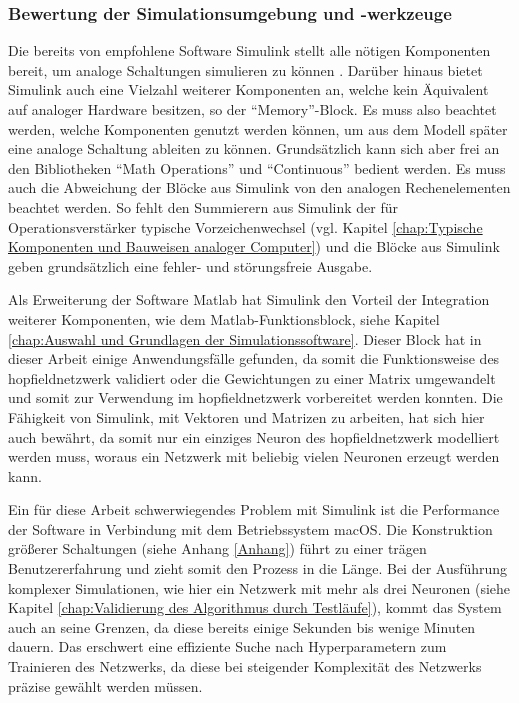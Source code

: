 \subsubsection{Bewertung der Simulationsumgebung und -werkzeuge}
\label{chap:Bewertung der Simulationsumgebung und -werkzeuge}

Die bereits von \citeauthor{Ulmann2022} empfohlene Software Simulink stellt alle nötigen Komponenten bereit, um analoge Schaltungen simulieren zu können \cite[vgl. S. 240]{Ulmann2022}. Darüber hinaus bietet Simulink auch eine Vielzahl weiterer Komponenten an, welche kein Äquivalent auf analoger Hardware besitzen, so \zb der "`Memory"'-Block. Es muss also beachtet werden, welche Komponenten genutzt werden können, um aus dem Modell später eine analoge Schaltung ableiten zu können. Grundsätzlich kann sich aber frei an den Bibliotheken "`Math Operations"' und "`Continuous"' bedient werden. Es muss auch die Abweichung der Blöcke aus Simulink von den analogen Rechenelementen beachtet werden. So fehlt \zb den Summierern aus Simulink der für Operationsverstärker typische Vorzeichenwechsel (vgl. Kapitel \ref{chap:Typische Komponenten und Bauweisen analoger Computer}) und die Blöcke aus Simulink geben grundsätzlich eine fehler- und störungsfreie Ausgabe.

Als Erweiterung der Software Matlab hat Simulink den Vorteil der Integration weiterer Komponenten, wie dem Matlab-Funktionsblock, siehe Kapitel \ref{chap:Auswahl und Grundlagen der Simulationssoftware}. Dieser Block hat in dieser Arbeit einige Anwendungsfälle gefunden, da somit \zb die Funktionsweise des \gls{hopfieldnetzwerk} validiert oder die Gewichtungen zu einer Matrix umgewandelt und somit zur Verwendung im \gls{hopfieldnetzwerk} vorbereitet werden konnten. Die Fähigkeit von Simulink, mit Vektoren und Matrizen zu arbeiten, hat sich hier auch bewährt, da somit nur ein einziges Neuron des \gls{hopfieldnetzwerk} modelliert werden muss, woraus ein Netzwerk mit beliebig vielen Neuronen erzeugt werden kann.

Ein für diese Arbeit schwerwiegendes Problem mit Simulink ist die Performance der Software in Verbindung mit dem Betriebssystem macOS. Die Konstruktion größerer Schaltungen (siehe \zb Anhang \ref{Anhang}) führt zu einer trägen Benutzererfahrung und zieht somit den Prozess in die Länge. Bei der Ausführung komplexer Simulationen, wie hier ein Netzwerk mit mehr als drei Neuronen (siehe Kapitel \ref{chap:Validierung des Algorithmus durch Testläufe}), kommt das System auch an seine Grenzen, da diese bereits einige Sekunden bis wenige Minuten dauern. Das erschwert \zb eine effiziente Suche nach Hyperparametern zum Trainieren des Netzwerks, da diese bei steigender Komplexität des Netzwerks präzise gewählt werden müssen.

